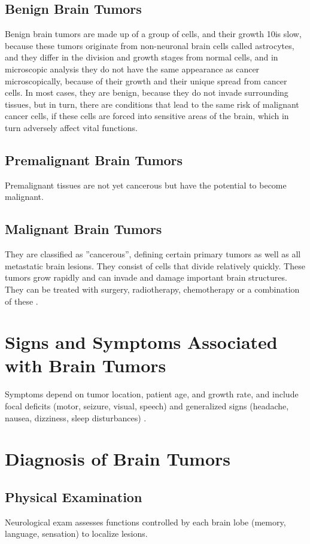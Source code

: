 \subsection{Benign Brain Tumors}
Benign brain tumors are made up of a group of cells, and their growth
10is slow, because these tumors originate from non-neuronal brain cells called
astrocytes, and they differ in the division and growth stages from normal
cells, and in microscopic analysis they do not have the same appearance
as cancer microscopically, because of their growth and their unique spread
from cancer cells. In most cases, they are benign, because they do not
invade surrounding tissues, but in turn, there are conditions that lead to
the same risk of malignant cancer cells, if these cells are forced into sensitive
areas of the brain, which in turn adversely affect vital functions.

\subsection{Premalignant Brain Tumors}
Premalignant tissues are not yet cancerous but have the potential to become malignant.

\subsection{Malignant Brain Tumors}
They are classified as ”cancerous”, defining certain primary tumors
as well as all metastatic brain lesions. They consist of cells that divide
relatively quickly. These tumors grow rapidly and can invade and damage
important brain structures. They can be treated with surgery, radiotherapy, chemotherapy or a combination of these \cite{ref8}.

\section{Signs and Symptoms Associated with Brain Tumors}
Symptoms depend on tumor location, patient age, and growth rate, and include focal deficits (motor, seizure, visual, speech) and generalized signs (headache, nausea, dizziness, sleep disturbances) \cite{ref9}.

\section{Diagnosis of Brain Tumors}
\subsection{Physical Examination}
Neurological exam assesses functions controlled by each brain lobe (memory, language, sensation) to localize lesions.

